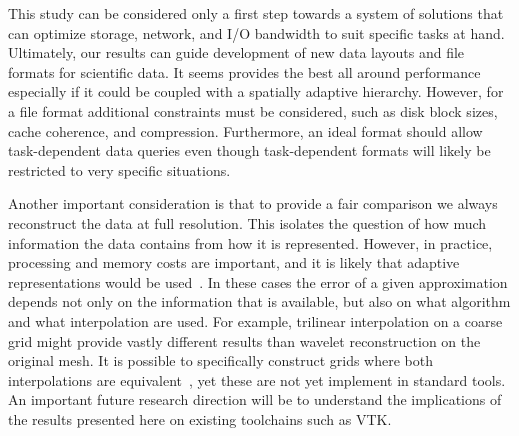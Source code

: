 This study can be considered only a first step towards a system of solutions that can optimize
storage, network, and I/O bandwidth to suit specific tasks at hand. Ultimately, our results can
guide development of new data layouts and file formats for scientific data. It seems \swav provides
the best all around performance especially if it could be coupled with a spatially adaptive
hierarchy. However, for a file format additional constraints must be considered, such as disk block
sizes, cache coherence, and compression. Furthermore, an ideal format should allow task-dependent
data queries even though task-dependent formats will likely be restricted to very specific
situations. 

Another important consideration is that to provide a fair comparison we always reconstruct the data
at full resolution. This isolates the question of how much information the data contains from how it
is represented. However, in practice, processing and memory costs are important, and it is likely
that adaptive representations would be used~\cite{gigavoxels,Gobbetti2008,vdb2013}. In these cases
the error of a given approximation depends not only on the information that is available, but also
on what algorithm and what interpolation are used. For example, trilinear interpolation on a coarse
grid might provide vastly different results than wavelet reconstruction on the original mesh. It is
possible to specifically construct grids where both interpolations are equivalent~\cite{weiss}, yet
these are not yet implement in standard tools. An important future research direction will be to
understand the implications of the results presented here on existing toolchains such as VTK.

